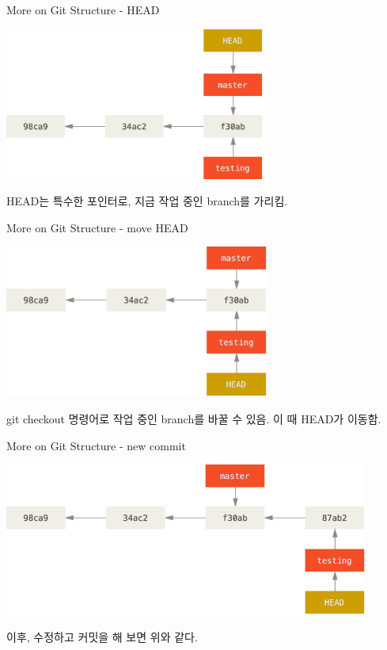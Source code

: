 \documentclass{beamer}
\begin{document}
\begin{frame}{More on Git Structure - HEAD} 
\begin{center}
\includegraphics[height=5cm,keepaspectratio]{head-to-master} \\
\end{center}
HEAD는 특수한 포인터로, 지금 작업 중인 branch를 가리킴. 
\end{frame}


\begin{frame}{More on Git Structure - move HEAD} 
\begin{center}
\includegraphics[height=5cm,keepaspectratio]{head-to-testing} \\
\end{center}
git checkout 명령어로 작업 중인 branch를 바꿀 수 있음. 이 때 HEAD가 이동함. 
\end{frame}


\begin{frame}{More on Git Structure - new commit} 

\begin{center}
\includegraphics[height=5cm,keepaspectratio]{advance-testing}
\end{center}
이후, 수정하고 커밋을 해 보면 위와 같다.
\end{frame}
\end{document}
